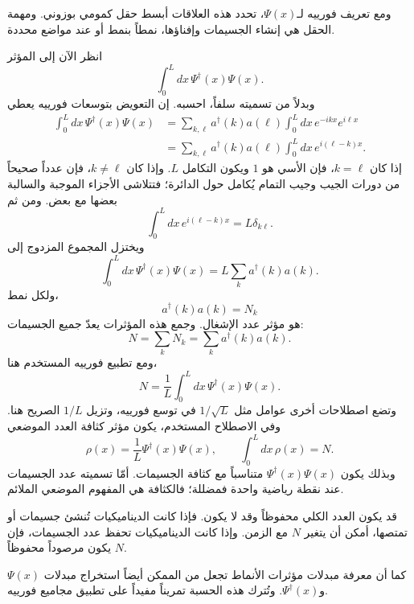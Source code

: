 ومع تعريف فورييه لـ\(\Psi(x)\)، تحدد هذه العلاقات أبسط حقل كمومي بوزوني. ومهمة الحقل هي إنشاء الجسيمات وإفناؤها، نمطاً بنمط أو عند مواضع محددة.

انظر الآن إلى المؤثر
\begin{equation}
\int_0^L dx\,\Psi^\dagger(x)\Psi(x).
\end{equation}
وبدلاً من تسميته سلفاً، احسبه. إن التعويض بتوسعات فورييه يعطي
\begin{align}
\int_0^L dx\,\Psi^\dagger(x)\Psi(x)
&=
\sum_{k,\ell}a^\dagger(k)a(\ell)
\int_0^L dx\,e^{-ikx}e^{i\ell x}
\\
&=
\sum_{k,\ell}a^\dagger(k)a(\ell)
\int_0^L dx\,e^{i(\ell-k)x}.
\end{align}
إذا كان \(k=\ell\)، فإن الأسي هو \(1\) ويكون التكامل \(L\). وإذا كان \(k\ne\ell\)، فإن عدداً صحيحاً من دورات الجيب وجيب التمام يُكامل حول الدائرة؛ فتتلاشى الأجزاء الموجبة والسالبة بعضها مع بعض. ومن ثم
\begin{equation}
\int_0^L dx\,e^{i(\ell-k)x}=L\delta_{k\ell}.
\end{equation}
ويختزل المجموع المزدوج إلى
\begin{equation}
\int_0^L dx\,\Psi^\dagger(x)\Psi(x)
=L\sum_k a^\dagger(k)a(k).
\end{equation}
ولكل نمط،
\begin{equation}
a^\dagger(k)a(k)=N_k
\end{equation}
هو مؤثر عدد الإشغال. وجمع هذه المؤثرات يعدّ جميع الجسيمات:
\begin{equation}
N=\sum_k N_k=\sum_k a^\dagger(k)a(k).
\end{equation}
ومع تطبيع فورييه المستخدم هنا،
\begin{equation}
N=\frac{1}{L}\int_0^L dx\,
\Psi^\dagger(x)\Psi(x).
\end{equation}
وتضع اصطلاحات أخرى عوامل مثل \(1/\sqrt{L}\) في توسع فورييه، وتزيل \(1/L\) الصريح هنا. وفي الاصطلاح المستخدم، يكون مؤثر كثافة العدد الموضعي
\begin{equation}
\rho(x)=\frac{1}{L}\Psi^\dagger(x)\Psi(x),
\qquad
\int_0^L dx\,\rho(x)=N.
\end{equation}
وبذلك يكون \(\Psi^\dagger(x)\Psi(x)\) متناسباً مع كثافة الجسيمات. أمّا تسميته عدد الجسيمات عند نقطة رياضية واحدة فمضللة؛ فالكثافة هي المفهوم الموضعي الملائم.

قد يكون العدد الكلي محفوظاً وقد لا يكون. فإذا كانت الديناميكيات تُنشئ جسيمات أو تمتصها، أمكن أن يتغير \(N\) مع الزمن. وإذا كانت الديناميكيات تحفظ عدد الجسيمات، فإن \(N\) يكون مرصوداً محفوظاً.

كما أن معرفة مبدلات مؤثرات الأنماط تجعل من الممكن أيضاً استخراج مبدلات \(\Psi(x)\) و\(\Psi^\dagger(x)\). وتُترك هذه الحسبة تمريناً مفيداً على تطبيق مجاميع فورييه.

